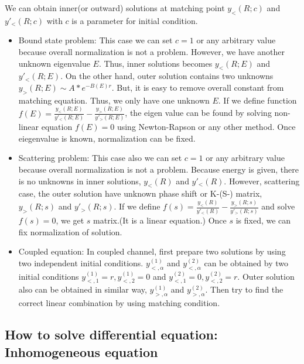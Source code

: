 \documentclass[10pt]{article}
\begin{document}
We can obtain inner(or outward) solutions at matching point 
$y_{<}(R;c)$ and $y'_{<}(R;c)$ with $c$ is a parameter for initial condition. 

\begin{itemize}
\item Bound state problem: This case we can set $c=1$ or any arbitrary
      value because overall normalization is not a problem. However,
      we have another unknown eigenvalue $E$. Thus, inner solutions becomes
      $y_{<}(R;E)$ and $y'_{<}(R;E)$. On the other hand, outer solution 
      contains two unknowns $y_{>}(R;E)\sim A*e^{-B(E) r}$. But, it is easy to remove
      overall constant from matching equation. Thus, we only have one unknown $E$.
      If we define function 
      $f(E)=\frac{y_{<}(R;E)}{y'_{<}(R;E)}-\frac{y_{>}(R;E)}{y'_{>}(R;E)}$, 
      the eigen value can be found by solving non-linear equation
      $f(E)=0$ using Newton-Rapson or any other method.
      Once eiegenvalue is known, normalization can be fixed.
      
\item Scattering problem: This case also we can set $c=1$ or any arbitrary
      value because overall normalization is not a problem. Because energy is given,
      there is no unknowns in inner solutions, $y_{<}(R)$ and $y'_{<}(R)$. 
      However, scattering case, the outer solution have unknown phase shift
      or K-(S-) matrix, $y_{>}(R;s)$ and $y'_{>}(R;s)$. If we define 
      $f(s)=\frac{y_{<}(R)}{y'_{<}(R)}-\frac{y_{>}(R;s)}{y'_{>}(R;s)}$ and solve
      $f(s)=0$, we get $s$ matrix.(It is a linear equation.)
      Once $s$ is fixed, we can fix normalization of solution.

\item Coupled equation: In coupled channel, first prepare two solutions by using 
      two independent initial conditions. 
      $y_{<,\alpha }^{(1)}$ and $y_{<,\alpha }^{(2)}$ can be 
      obtained by two initial conditions $y_{<,1}^{(1)}=r,y_{<,2}^{(1)}=0$
      and $y_{<,1}^{(2)}=0,y_{<,2}^{(2)}=r$. 
      Outer solution also can be obtained in similar way,
      $y_{>,\alpha}^{(1)}$ and $y_{>,\alpha}^{(2)}$.
      Then try to find the correct linear combination by using matching condition. 

\end{itemize}


\subsection{How to solve differential equation: Inhomogeneous equation  }
\end{document}
